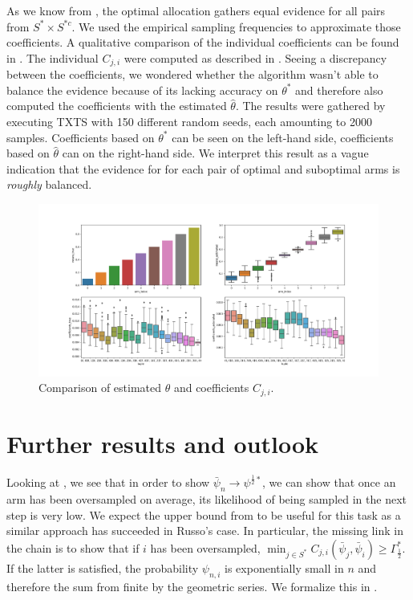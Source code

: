 As we know from , the optimal allocation
gathers equal evidence for all pairs from $S^* \times S^{*c}$. We used the
empirical sampling frequencies to approximate those coefficients. A qualitative
comparison of the individual coefficients can be found in
. The individual $C_{j, i}$ were computed as
described in . Seeing a discrepancy
between the coefficients, we wondered whether the algorithm wasn't able to
balance the evidence because of its lacking accuracy on $\theta^*$ and therefore
also computed the coefficients with the estimated $\hat{\theta}$. The results
were gathered by executing TXTS with 150 different random seeds, each amounting to 2000 samples. Coefficients based on $\theta^*$ can be seen on the left-hand side, coefficients based on $\hat{\theta}$ can on the right-hand side. We interpret this result as a vague indication that the evidence for for each pair of optimal and suboptimal arms is \emph{roughly} balanced.
\begin{figure}[h]
  \centering
  \includegraphics[width=\textwidth]{190909-coefficients_2000.png}
  \caption{Comparison of estimated $\theta$ and coefficients $C_{j, i}$.}
  \label{fig:algorithm_coefficients}
\end{figure}

\section{Further results and outlook}\label{section:further_results}

Looking at , we see that in
order to show $\bar{\psi}_n \rightarrow \psi^{\frac{1}{2}*}$, we can show that
once an arm has been oversampled on average, its likelihood of being sampled in
the next step is very low. We expect the upper bound from
 to be useful for this task as a similar approach has
succeeded in Russo's case. In particular, the missing link in the chain is to
show that if $i$ has been oversampled, $\min_{j \in S^*} C_{j, i}(\bar{\psi}_j,
\bar{\psi}_i) \geq \Gamma^*_{\frac{1}{2}}$. If the latter is satisfied, the
probability $\psi_{n, i}$ is exponentially small in $n$ and therefore the sum
from  finite by the geometric
series. We formalize this in .

